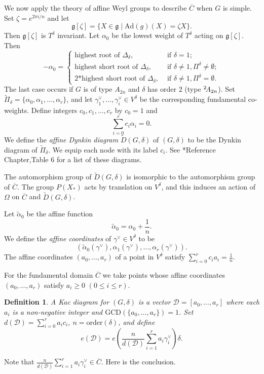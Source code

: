 \documentclass[10pt,leqno]{article}
\newtheorem{definition}[equation]{Definition}
\newcommand{\D}{\mathcal D}
\newcommand{\Ad}{\text{Ad}}
\newcommand{\ch}[1]{#1^\vee}
\newcommand{\g}{\mathfrak g}
\newcommand\wt{\widetilde}
\newcommand{\Daffine}{\wt D(G,\delta)}
\def\ge{\geqslant}
\def\le{\leqslant}
\newcommand{\twoAeven}{\phantom{}^2\negthinspace A_{2n}}
\begin{document}
We now apply the  theory of  affine Weyl groups to describe $\overline C$
when $G$ is simple.
Set $\zeta=e^{2\pi i/n}$ and let
$$
\g[\zeta]=\{X\in \g\mid \Ad(g)(X)=\zeta X\}.
$$
Then $\g[\zeta]$ is $T^\delta$ invariant. Let $\alpha_0$ be the lowest weight of $T^\delta$ acting on $\g[\zeta]$.
Then
$$
-\alpha_0=
\begin{cases}
  \text{highest root of }\Delta_\delta, &\text{ if } \delta=1;\\
  \text{highest short root of }\Delta_\delta, &\text{ if }\delta\ne 1,\Pi^\delta\ne\emptyset;\\
  \text{2*highest short root of }\Delta_\delta, &\text{ if }\delta\ne 1,\Pi^\delta=\emptyset.
\end{cases}
$$
The last case occurs if $G$ is of type $A_{2n}$ and $\delta$ has order $2$ (type $\twoAeven$).
Set $\wt\Pi_\delta=\{\alpha_0,\alpha_1,\dots,\alpha_r\}$,
and let $\ch\gamma_1,\dots,\ch\gamma_i\in V^\delta$ be the corresponding fundamental co-weights.
Define integers $c_0,c_1,\dots, c_r$ by $c_0=1$ and 
$$
\sum_{i=0}^r c_i\alpha_i=0.
$$
We define the {\it affine Dynkin diagram}  $\Daffine$ of $(G,\delta)$ to be the
Dynkin diagram of $\wt\Pi_\delta$. We equip each node with its label $c_i$.
See \cite{ov}*{Reference Chapter,Table 6} for a list of these diagrams.

The automorphism group of $\Daffine$ is isomorphic to the
automorphism group of $\overline C$. The group $P(X_*)$ acts by
translation on $V^\delta$, and this induces an action of $\Omega$ on
$\overline C$ and $\Daffine$.



Let $\wt\alpha_0$ be the affine function
$$
\wt\alpha_0=\alpha_0+\frac1n.
$$
We define the {\it affine coordinates} of  $\ch\gamma\in V^\delta$ to be
$$
(\wt\alpha_0(\ch\gamma),\alpha_1(\ch\gamma),\dots, \alpha_r(\ch\gamma)).
$$
The affine coordinates $(a_0,\dots, a_r)$ of a point  in $V^\delta$ satisfy
$\sum_{i=0}^r c_ia_i=\frac1n$.

For the fundamental domain $\overline C$ we take
points whose affine coordinates $(a_0,\dots, a_r)$ satisfy $a_i\ge 0$ $(0\le i\le r)$.


\begin{definition}
A Kac diagram for $(G,\delta)$ is a vector $\mathcal D=[a_0,\dots, a_r]$ where
each $a_i$ is a non-negative integer and $\text{GCD}(\{a_0,\dots, a_r\})=1$.
Set $d(\D)=\sum_{i=0}^r a_ic_i$, $n=\text{order}(\delta)$, and define
$$
e(\D)= e(\frac n{d(\D)}\sum_{i=1}^r a_i\ch\gamma_i)\delta.
$$
\end{definition}
Note that $\frac n{d(\D)}\sum_{i=1}^r a_i\ch\gamma_i\in \overline C$.
Here is the conclusion.
\end{document}

